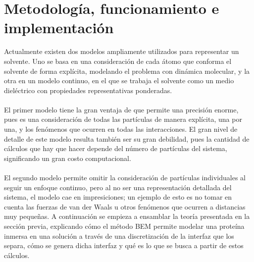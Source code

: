 \documentclass[12pt, notitlepage]{article}
\numberwithin{equation}{section}
\begin{document}



\section{Metodología, funcionamiento e implementación}
Actualmente existen dos modelos ampliamente utilizados para representar un solvente. Uno se basa en una consideración de cada átomo que conforma el solvente de forma explícita, modelando el problema con dinámica molecular, y la otra en un modelo continuo, en el que se trabaja el solvente como un medio dieléctrico con propiedades representativas ponderadas.\\\\
El primer modelo tiene la gran ventaja de que permite una precisión enorme, pues es una consideración de todas las partículas de manera explícita, una por una, y los fenómenos que ocurren en todas las interacciones. El gran nivel de detalle de este modelo resulta también ser su gran debilidad, pues la cantidad de cálculos que hay que hacer depende del número de partículas del sistema, significando un gran costo computacional.\\\\
El segundo modelo permite omitir la consideración de partículas individuales al seguir un enfoque continuo, pero al no ser una representación detallada del sistema, el modelo cae en impresiciones; un ejemplo de esto es no tomar en cuenta las fuerzas de van der Waals u otros fenómenos que ocurren a distancias muy pequeñas. A continuación se empieza a ensamblar la teoría presentada en la sección previa, explicando cómo el método BEM permite modelar una proteína inmersa en una solución a través de una discretización de la interfaz que los separa, cómo se genera dicha interfaz y qué es lo que se busca a partir de estos cálculos.
\end{document}
